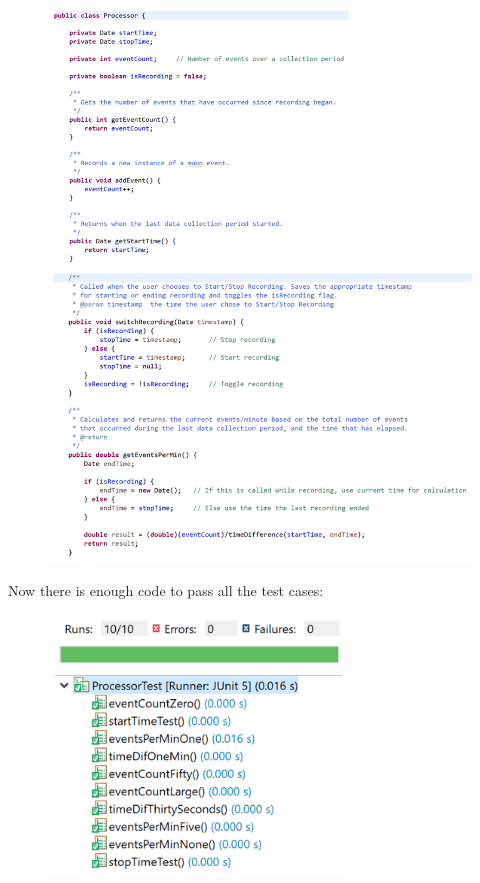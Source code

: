 \documentclass[11pt,a4paper]{article}
\begin{document}
\begin{figure}[h]
	\includegraphics[width=1.1\textwidth]{codeimg6.png}
\end{figure}

\newpage

Now there is enough code to pass all the test cases:

\begin{figure}[h]
	\includegraphics[width=0.7\textwidth]{codeimg7.png}
\end{figure}
\end{document}
